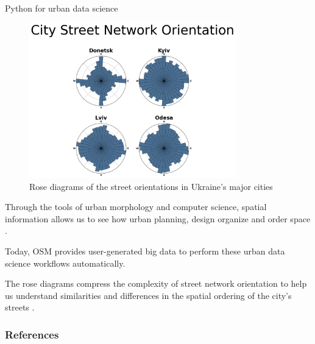 \documentclass{beamer}
\begin{document}
\begin{frame}{Python for urban data science}
\begin{figure}
\includegraphics[width=0.8\textwidth]{images/street-orientations.png}
\caption{Rose diagrams of the street orientations in Ukraine's major cities}
\end{figure}
\end{frame}


\begin{frame}
Through the tools of urban morphology and computer science, spatial information allows us  to see how urban planning, design organize and order space \cite{Boeing2017}.  \pause

Today, OSM provides user-generated big data to perform
these urban data science workflows automatically. \pause

The rose diagrams compress the complexity of street network orientation to help us understand similarities and differences in the spatial ordering of the city’s streets \cite{Boeing2019}.
\end{frame}
\begin{frame}
\frametitle{References}


\end{frame}
\end{document}
